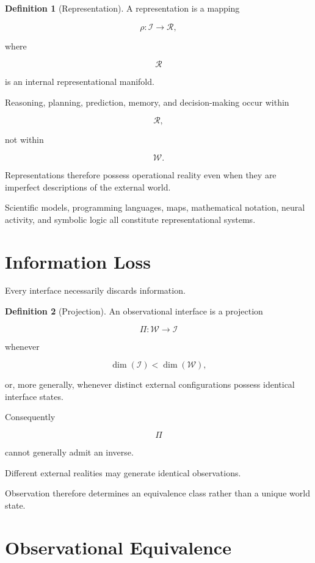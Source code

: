 \documentclass[11pt,oneside]{book}
\numberwithin{equation}{chapter}
\theoremstyle{definition}
\newtheorem{definition}{Definition}[chapter]
\theoremstyle{plain}
\begin{document}
\begin{definition}[Representation]

A representation is a mapping

\[
\rho:
\mathcal{I}
\rightarrow
\mathcal{R},
\]

where

\[
\mathcal{R}
\]

is an internal representational manifold.

Reasoning, planning, prediction, memory, and decision-making occur within

\[
\mathcal{R},
\]

not within

\[
\mathcal{W}.
\]

\end{definition}

Representations therefore possess operational reality even when they are
imperfect descriptions of the external world.

Scientific models, programming languages, maps, mathematical notation,
neural activity, and symbolic logic all constitute representational systems.

\section{Information Loss}

Every interface necessarily discards information.

\begin{definition}[Projection]

An observational interface is a projection

\[
\Pi:
\mathcal{W}
\rightarrow
\mathcal{I}
\]

whenever

\[
\dim(\mathcal{I})
<
\dim(\mathcal{W}),
\]

or, more generally, whenever distinct external configurations possess
identical interface states.

\end{definition}

Consequently

\[
\Pi
\]

cannot generally admit an inverse.

Different external realities may generate identical observations.

Observation therefore determines an equivalence class rather than a unique
world state.

\section{Observational Equivalence}
\end{document}

